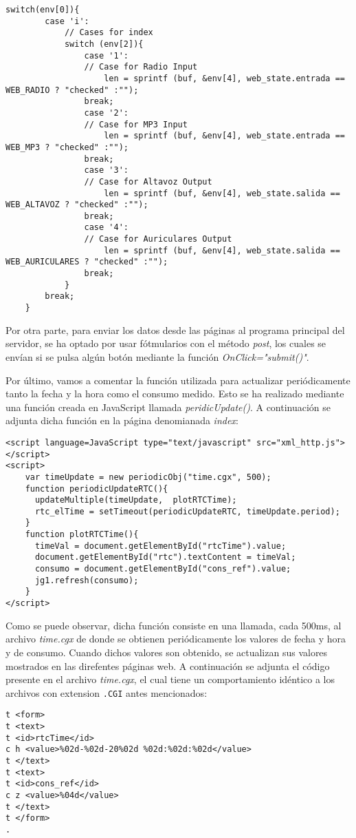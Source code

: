 \begin{lstlisting}[captionpos=b, caption={Ejemplo procesamiento archivo .CGI}]
	switch(env[0]){
		case 'i':
			// Cases for index
			switch (env[2]){
				case '1':
				// Case for Radio Input
					len = sprintf (buf, &env[4], web_state.entrada == WEB_RADIO ? "checked" :"");
				break;
				case '2':
				// Case for MP3 Input
					len = sprintf (buf, &env[4], web_state.entrada == WEB_MP3 ? "checked" :"");
				break;
				case '3':
				// Case for Altavoz Output
					len = sprintf (buf, &env[4], web_state.salida == WEB_ALTAVOZ ? "checked" :"");
				break;
				case '4':
				// Case for Auriculares Output
					len = sprintf (buf, &env[4], web_state.salida == WEB_AURICULARES ? "checked" :"");
				break;
            }
        break;
    }
\end{lstlisting}

Por otra parte, para enviar los datos desde las páginas al programa principal del servidor, se ha optado por usar fótmularios con el método \textit{post}, los cuales se envían si se pulsa algún botón mediante la función \textit{OnClick="submit()"}.

Por último, vamos a comentar la función utilizada para actualizar periódicamente tanto la fecha y la hora como el consumo medido. Esto se ha realizado mediante una función creada en JavaScript llamada \textit{peridicUpdate()}. A continuación se adjunta dicha función en la página denomianada \textit{index}:

\begin{lstlisting}[captionpos=b, caption={Función updatePeriodic()}]
<script language=JavaScript type="text/javascript" src="xml_http.js"></script>
<script>
    var timeUpdate = new periodicObj("time.cgx", 500);
    function periodicUpdateRTC(){
      updateMultiple(timeUpdate,  plotRTCTime);
      rtc_elTime = setTimeout(periodicUpdateRTC, timeUpdate.period);
    }
    function plotRTCTime(){
      timeVal = document.getElementById("rtcTime").value;
      document.getElementById("rtc").textContent = timeVal;
      consumo = document.getElementById("cons_ref").value;
      jg1.refresh(consumo);
    }
</script>
\end{lstlisting}

Como se puede observar, dicha función consiste en una llamada, cada 500ms, al archivo \textit{time.cgx} de donde se obtienen periódicamente los valores de fecha y hora y de consumo. Cuando dichos valores son obtenido, se actualizan sus valores mostrados en las direfentes páginas web. A continuación se adjunta el código presente en el archivo \textit{time.cgx}, el cual tiene un comportamiento idéntico a los archivos con extension \texttt{.CGI} antes mencionados:

\begin{lstlisting}[captionpos=b, caption={Archivo time.cgx}]
t <form>
t <text>
t <id>rtcTime</id>
c h <value>%02d-%02d-20%02d %02d:%02d:%02d</value>
t </text>
t <text>
t <id>cons_ref</id>
c z <value>%04d</value>
t </text>
t </form>
.
\end{lstlisting}
